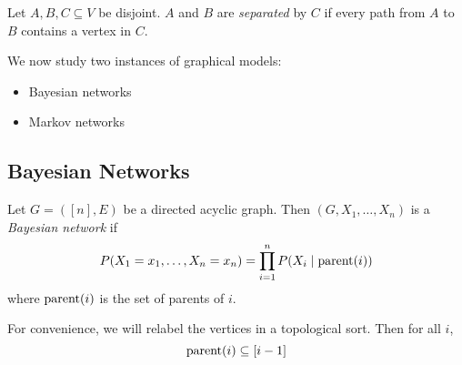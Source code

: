 \begin{definition*}[Separation] \label{def:graph:separation}
    Let $A, B, C \subseteq V$ be disjoint.
    $A$ and $B$ are \emph{separated} by $C$ if every path from $A$ to $B$
    contains a vertex in $C$.
\end{definition*}

We now study two instances of graphical models:
\begin{itemize}
    \item Bayesian networks
    \item Markov networks
\end{itemize}
\subsection{Bayesian Networks} \label{sec:bayes_networks}
\begin{definition*}
    Let $G = ([n], E)$ be a directed acyclic graph.
    Then $(G, X_1, \dots, X_n)$ is a \emph{Bayesian network} if \[
        P(X_1=x_1, \dots, X_n=x_n)
            = \prod_{i=1}^n P(X_i \mid \operatorname{parent}(i))
    \] where $\operatorname{parent}(i)$ is the set of parents of $i$.
\end{definition*}
For convenience, we will relabel the vertices in a topological sort.
Then for all $i$, \[
    \operatorname{parent}(i) \subseteq [i-1]
\]

